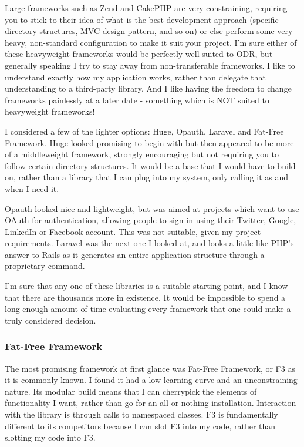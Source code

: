 Large frameworks such as Zend and CakePHP are very constraining, requiring you to stick to their idea of what is the best development approach (specific directory structures, MVC design pattern, and so on) or else perform some very heavy, non-standard configuration to make it suit your project. I'm sure either of these heavyweight frameworks would be perfectly well suited to ODR, but generally speaking I try to stay away from non-transferable frameworks. I like to understand exactly how my application works, rather than delegate that understanding to a third-party library. And I like having the freedom to change frameworks painlessly at a later date - something which is NOT suited to heavyweight frameworks!

I considered a few of the lighter options: Huge, Opauth, Laravel and Fat-Free Framework. Huge looked promising to begin with but then appeared to be more of a middleweight framework, strongly encouraging but not requiring you to follow certain directory structures. It would be a base that I would have to build on, rather than a library that I can plug into my system, only calling it as and when I need it.

Opauth looked nice and lightweight, but was aimed at projects which want to use OAuth for authentication, allowing people to sign in using their Twitter, Google, LinkedIn or Facebook account. This was not suitable, given my project requirements. Laravel was the next one I looked at, and looks a little like PHP's answer to Rails as it generates an entire application structure through a proprietary command.

I'm sure that any one of these libraries is a suitable starting point, and I know that there are thousands more in existence. It would be impossible to spend a long enough amount of time evaluating every framework that one could make a truly considered decision.

\subsubsection{Fat-Free Framework}

The most promising framework at first glance was Fat-Free Framework, or F3 as it is commonly known. I found it had a low learning curve and an unconstraining nature. Its modular build means that I can cherrypick the elements of functionality I want, rather than go for an all-or-nothing installation. Interaction with the library is through calls to namespaced classes. F3 is fundamentally different to its competitors because I can slot F3 into my code, rather than slotting my code into F3.

